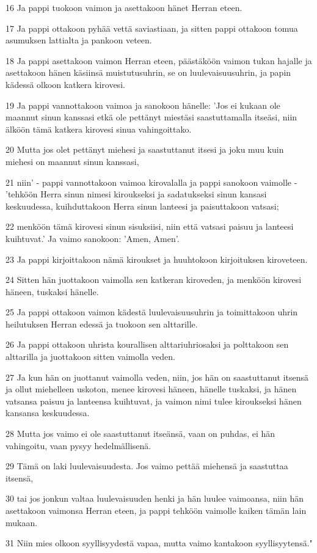 \par 16 Ja pappi tuokoon vaimon ja asettakoon hänet Herran eteen.
\par 17 Ja pappi ottakoon pyhää vettä saviastiaan, ja sitten pappi ottakoon tomua asumuksen lattialta ja pankoon veteen.
\par 18 Ja pappi asettakoon vaimon Herran eteen, päästäköön vaimon tukan hajalle ja asettakoon hänen käsiinsä muistutusuhrin, se on luulevaisuusuhrin, ja papin kädessä olkoon katkera kirovesi.
\par 19 Ja pappi vannottakoon vaimoa ja sanokoon hänelle: 'Jos ei kukaan ole maannut sinun kanssasi etkä ole pettänyt miestäsi saastuttamalla itseäsi, niin älköön tämä katkera kirovesi sinua vahingoittako.
\par 20 Mutta jos olet pettänyt miehesi ja saastuttanut itsesi ja joku muu kuin miehesi on maannut sinun kanssasi,
\par 21 niin' - pappi vannottakoon vaimoa kirovalalla ja pappi sanokoon vaimolle - 'tehköön Herra sinun nimesi kiroukseksi ja sadatukseksi sinun kansasi keskuudessa, kuihduttakoon Herra sinun lanteesi ja paisuttakoon vatsasi;
\par 22 menköön tämä kirovesi sinun sisuksiisi, niin että vatsasi paisuu ja lanteesi kuihtuvat.' Ja vaimo sanokoon: 'Amen, Amen'.
\par 23 Ja pappi kirjoittakoon nämä kiroukset ja huuhtokoon kirjoituksen kiroveteen.
\par 24 Sitten hän juottakoon vaimolla sen katkeran kiroveden, ja menköön kirovesi häneen, tuskaksi hänelle.
\par 25 Ja pappi ottakoon vaimon kädestä luulevaisuusuhrin ja toimittakoon uhrin heilutuksen Herran edessä ja tuokoon sen alttarille.
\par 26 Ja pappi ottakoon uhrista kourallisen alttariuhriosaksi ja polttakoon sen alttarilla ja juottakoon sitten vaimolla veden.
\par 27 Ja kun hän on juottanut vaimolla veden, niin, jos hän on saastuttanut itsensä ja ollut miehelleen uskoton, menee kirovesi häneen, hänelle tuskaksi, ja hänen vatsansa paisuu ja lanteensa kuihtuvat, ja vaimon nimi tulee kiroukseksi hänen kansansa keskuudessa.
\par 28 Mutta jos vaimo ei ole saastuttanut itseänsä, vaan on puhdas, ei hän vahingoitu, vaan pysyy hedelmällisenä.
\par 29 Tämä on laki luulevaisuudesta. Jos vaimo pettää miehensä ja saastuttaa itsensä,
\par 30 tai jos jonkun valtaa luulevaisuuden henki ja hän luulee vaimoansa, niin hän asettakoon vaimonsa Herran eteen, ja pappi tehköön vaimolle kaiken tämän lain mukaan.
\par 31 Niin mies olkoon syyllisyydestä vapaa, mutta vaimo kantakoon syyllisyytensä."

